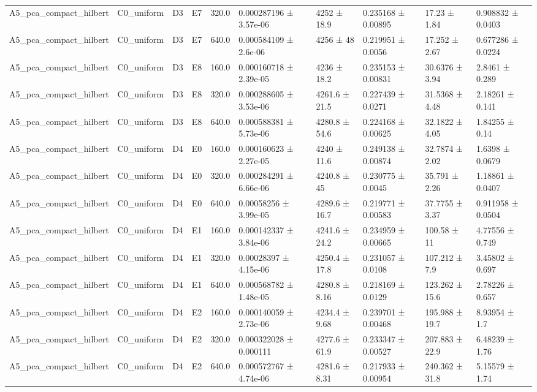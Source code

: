 \begin{table}
\begin{tabular}{llllllllll}
A5\_pca\_compact\_hilbert & C0\_uniform & D3 & E7 & 320.0 & 0.000287196 ± 3.57e-06 & 4252 ± 18.9 & 0.235168 ± 0.00895 & 17.23 ± 1.84 & 0.908832 ± 0.0403 \\
A5\_pca\_compact\_hilbert & C0\_uniform & D3 & E7 & 640.0 & 0.000584109 ± 2.6e-06 & 4256 ± 48 & 0.219951 ± 0.0056 & 17.252 ± 2.67 & 0.677286 ± 0.0224 \\
A5\_pca\_compact\_hilbert & C0\_uniform & D3 & E8 & 160.0 & 0.000160718 ± 2.39e-05 & 4236 ± 18.2 & 0.235153 ± 0.00831 & 30.6376 ± 3.94 & 2.8461 ± 0.289 \\
A5\_pca\_compact\_hilbert & C0\_uniform & D3 & E8 & 320.0 & 0.000288605 ± 3.53e-06 & 4261.6 ± 21.5 & 0.227439 ± 0.0271 & 31.5368 ± 4.48 & 2.18261 ± 0.141 \\
A5\_pca\_compact\_hilbert & C0\_uniform & D3 & E8 & 640.0 & 0.000588381 ± 5.73e-06 & 4280.8 ± 54.6 & 0.224168 ± 0.00625 & 32.1822 ± 4.05 & 1.84255 ± 0.14 \\
A5\_pca\_compact\_hilbert & C0\_uniform & D4 & E0 & 160.0 & 0.000160623 ± 2.27e-05 & 4240 ± 11.6 & 0.249138 ± 0.00874 & 32.7874 ± 2.02 & 1.6398 ± 0.0679 \\
A5\_pca\_compact\_hilbert & C0\_uniform & D4 & E0 & 320.0 & 0.000284291 ± 6.66e-06 & 4240.8 ± 45 & 0.230775 ± 0.0045 & 35.791 ± 2.26 & 1.18861 ± 0.0407 \\
A5\_pca\_compact\_hilbert & C0\_uniform & D4 & E0 & 640.0 & 0.00058256 ± 3.99e-05 & 4289.6 ± 16.7 & 0.219771 ± 0.00583 & 37.7755 ± 3.37 & 0.911958 ± 0.0504 \\
A5\_pca\_compact\_hilbert & C0\_uniform & D4 & E1 & 160.0 & 0.000142337 ± 3.84e-06 & 4241.6 ± 24.2 & 0.234959 ± 0.00665 & 100.58 ± 11 & 4.77556 ± 0.749 \\
A5\_pca\_compact\_hilbert & C0\_uniform & D4 & E1 & 320.0 & 0.00028397 ± 4.15e-06 & 4250.4 ± 17.8 & 0.231057 ± 0.0108 & 107.212 ± 7.9 & 3.45802 ± 0.697 \\
A5\_pca\_compact\_hilbert & C0\_uniform & D4 & E1 & 640.0 & 0.000568782 ± 1.48e-05 & 4280.8 ± 8.16 & 0.218169 ± 0.0129 & 123.262 ± 15.6 & 2.78226 ± 0.657 \\
A5\_pca\_compact\_hilbert & C0\_uniform & D4 & E2 & 160.0 & 0.000140059 ± 2.73e-06 & 4234.4 ± 9.68 & 0.239701 ± 0.00468 & 195.988 ± 19.7 & 8.93954 ± 1.7 \\
A5\_pca\_compact\_hilbert & C0\_uniform & D4 & E2 & 320.0 & 0.000322028 ± 0.000111 & 4277.6 ± 61.9 & 0.233347 ± 0.00527 & 207.883 ± 22.9 & 6.48239 ± 1.76 \\
A5\_pca\_compact\_hilbert & C0\_uniform & D4 & E2 & 640.0 & 0.000572767 ± 4.74e-06 & 4281.6 ± 8.31 & 0.217933 ± 0.00954 & 240.362 ± 31.8 & 5.15579 ± 1.74 \\

\end{tabular}
\end{table}
